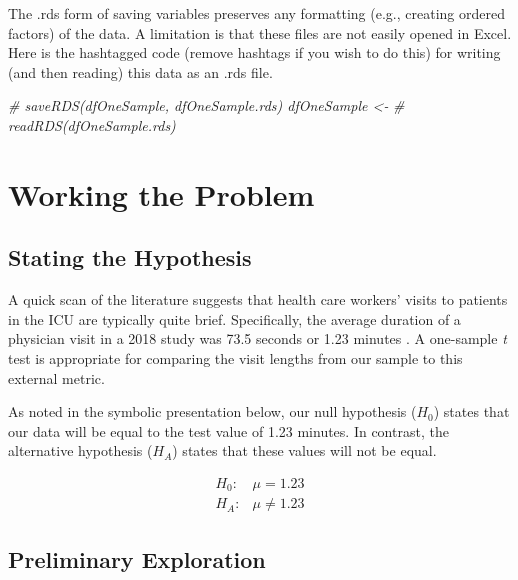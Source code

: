 \documentclass[
  11pt,
]{book}
\newenvironment{Shaded}{\begin{snugshade}}{\end{snugshade}}
\newcommand{\CommentTok}[1]{\textcolor[rgb]{0.56,0.35,0.01}{\textit{#1}}}
\begin{document}
The .rds form of saving variables preserves any formatting (e.g., creating ordered factors) of the data. A limitation is that these files are not easily opened in Excel. Here is the hashtagged code (remove hashtags if you wish to do this) for writing (and then reading) this data as an .rds file.

\begin{Shaded}
\begin{Highlighting}[]
\CommentTok{\# saveRDS(dfOneSample, \textquotesingle{}dfOneSample.rds\textquotesingle{}) dfOneSample \textless{}{-}}
\CommentTok{\# readRDS(\textquotesingle{}dfOneSample.rds\textquotesingle{})}
\end{Highlighting}
\end{Shaded}

\hypertarget{working-the-problem}{%
\section{Working the Problem}\label{working-the-problem}}

\hypertarget{stating-the-hypothesis}{%
\subsection{Stating the Hypothesis}\label{stating-the-hypothesis}}

A quick scan of the literature suggests that health care workers' visits to patients in the ICU are typically quite brief. Specifically, the average duration of a physician visit in a 2018 study was 73.5 seconds or 1.23 minutes \citep{butler_estimating_2018}. A one-sample \emph{t} test is appropriate for comparing the visit lengths from our sample to this external metric.

As noted in the symbolic presentation below, our null hypothesis (\(H_0\)) states that our data will be equal to the test value of 1.23 minutes. In contrast, the alternative hypothesis (\(H_A\)) states that these values will not be equal.

\[
\begin{array}{ll}
H_0: & \mu = 1.23 \\
H_A: & \mu \neq 1.23
\end{array}
\]

\hypertarget{preliminary-exploration}{%
\subsection{Preliminary Exploration}\label{preliminary-exploration}}
\end{document}
